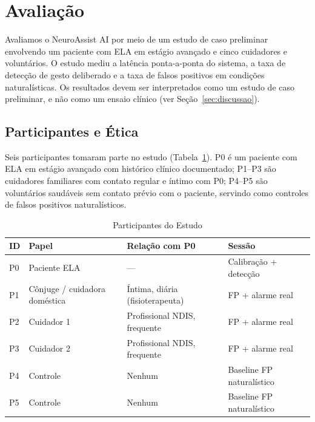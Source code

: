 
\section{Avaliação}
\label{sec:avaliacao}

Avaliamos o NeuroAssist AI por meio de um estudo de caso preliminar envolvendo um
paciente com ELA em estágio avançado e cinco cuidadores e voluntários. O estudo
mediu a latência ponta-a-ponta do sistema, a taxa de detecção de gesto deliberado e
a taxa de falsos positivos em condições naturalísticas. Os resultados devem ser
interpretados como um estudo de caso preliminar, e não como um ensaio clínico (ver
Seção~\ref{sec:discussao}).

\subsection{Participantes e Ética}
\label{sec:participantes}

Seis participantes tomaram parte no estudo (Tabela~\ref{tab:participantes}).
P0 é um paciente com ELA em estágio avançado com histórico clínico documentado;
P1--P3 são cuidadores familiares com contato regular e íntimo com P0; P4--P5 são
voluntários saudáveis sem contato prévio com o paciente, servindo como controles
de falsos positivos naturalísticos.

\begin{table}[htbp]
  \renewcommand{\arraystretch}{1.15}
  \caption{Participantes do Estudo}
  \label{tab:participantes}
  \centering
  \begin{tabular}{llll}
    \toprule
    ID & Papel & Relação com P0 & Sessão \\
    \midrule
    P0 & Paciente ELA          & ---                              & Calibração + detecção \\
    P1 & Cônjuge / cuidadora doméstica & Íntima, diária (fisioterapeuta)   & FP + alarme real \\
    P2 & Cuidador 1                   & Profissional NDIS, frequente      & FP + alarme real \\
    P3 & Cuidador 2                   & Profissional NDIS, frequente      & FP + alarme real \\
    P4 & Controle           & Nenhum                     & Baseline FP naturalístico \\
    P5 & Controle           & Nenhum                     & Baseline FP naturalístico \\
    \bottomrule
  \end{tabular}
\end{table}

